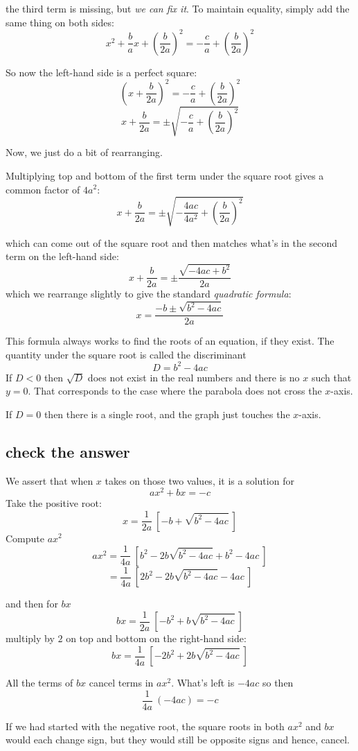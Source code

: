\documentclass[11pt, oneside]{article}
\begin{document}
the third term is missing, but \emph{we can fix it}.  To maintain equality, simply add the same thing on both sides:
\[ x^2 + \frac{b}{a} x + (\frac{b}{2a})^2  = -\frac{c}{a} + (\frac{b}{2a})^2 \]

So now the left-hand side is a perfect square:
\[ (x + \frac{b}{2a})^2 = -\frac{c}{a} + (\frac{b}{2a})^2 \]
\[ x + \frac{b}{2a} = \pm \sqrt{-\frac{c}{a} + (\frac{b}{2a})^2} \]

Now, we just do a bit of rearranging.

Multiplying top and bottom of the first term under the square root gives a common factor of $4a^2$:
\[ x + \frac{b}{2a} = \pm \sqrt{-\frac{4ac}{4a^2} + (\frac{b}{2a})^2} \]

which can come out of the square root and then matches what's in the second term on the left-hand side:
\[ x + \frac{b}{2a} = \pm \frac{\sqrt{-4ac + b^2}}{2a} \]
which we rearrange slightly to give the standard \emph{quadratic formula}:
\[ x = \frac{-b \pm \sqrt{b^2 - 4ac}}{2a} \]

This formula always works to find the roots of an equation, if they exist.  The quantity under the square root is called the discriminant
\[ D = b^2 - 4ac \]
If $D < 0$ then $\sqrt{D}$ does not exist in the real numbers and there is no $x$ such that $y = 0$.  That corresponds to the case where the parabola does not cross the $x$-axis.

If $D = 0$ then there is a single root, and the graph just touches the $x$-axis.

\subsection*{check the answer}

We assert that when $x$ takes on those two values, it is a solution for
\[ ax^2 + bx = -c \]
Take the positive root:
\[ x = \frac{1}{2a} \ [ -b + \sqrt{b^2 - 4ac} \ ] \]
Compute $ax^2$
\[ ax^2 = \frac{1}{4a} \ [ b^2 - 2 b \sqrt{b^2 - 4ac} + b^2 - 4ac \ ] \]
\[ = \frac{1}{4a} \ [ 2b^2 - 2b \sqrt{b^2 - 4ac} - 4ac \ ] \]

and then for $bx$
\[ bx = \frac{1}{2a} \ [ -b^2 + b \sqrt{b^2 - 4ac} \ ] \]
multiply by $2$ on top and bottom on the right-hand side:
\[ bx = \frac{1}{4a} \ [ -2b^2 + 2b \sqrt{b^2 - 4ac} \ ] \]

All the terms of $bx$ cancel terms in $ax^2$.  What's left is $- 4ac$ so then
\[ \frac{1}{4a} \ (- 4ac) = -c \]

If we had started with the negative root, the square roots in both $ax^2$ and $bx$ would each change sign, but they would still be opposite signs and hence, cancel.
\end{document}
